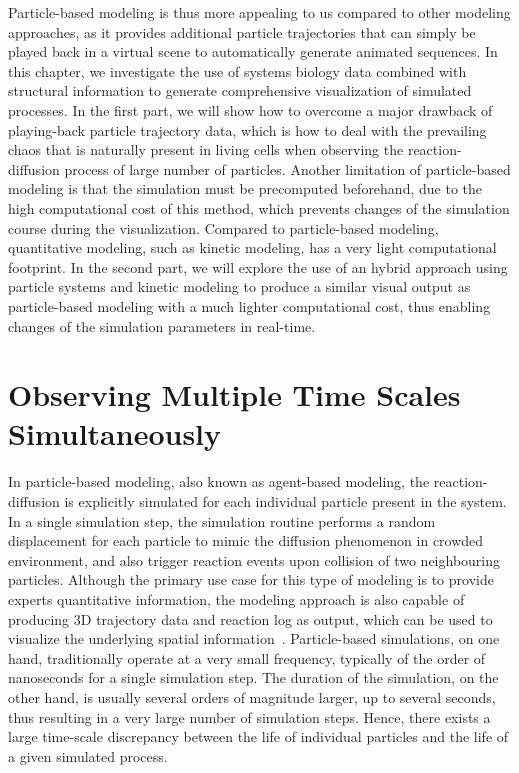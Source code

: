 Particle-based modeling is thus more appealing to us compared to other modeling approaches, as it provides additional particle trajectories that can simply be played back in a virtual scene to automatically generate animated sequences.
In this chapter, we investigate the use of systems biology data combined with structural information to generate comprehensive visualization of simulated processes.
In the first part, we will show how to overcome a major drawback of playing-back particle trajectory data, which is how to deal with the prevailing chaos that is naturally present in living cells when observing the reaction-diffusion process of large number of particles.
Another limitation of particle-based modeling is that the simulation must be precomputed beforehand, due to the high computational cost of this method, which prevents changes of the simulation course during the visualization.
Compared to particle-based modeling, quantitative modeling, such as kinetic modeling, has a very light computational footprint.
In the second part, we will explore the use of an hybrid approach using particle systems and kinetic modeling to produce a similar visual output as particle-based modeling with a much lighter computational cost, thus enabling changes of the simulation parameters in real-time. 

\section{Observing Multiple Time Scales Simultaneously}

In particle-based modeling, also known as agent-based modeling, the reaction-diffusion is explicitly simulated for each individual particle present in the system.
In a single simulation step, the simulation routine performs a random displacement for each particle to mimic the diffusion phenomenon in crowded environment, and also trigger reaction events upon collision of two neighbouring particles.
Although the primary use case for this type of modeling is to provide experts quantitative information, the modeling approach is also capable of producing 3D trajectory data and reaction log as output, which can be used to visualize the underlying spatial information~\cite{falk2009visualization}.
Particle-based simulations, on one hand, traditionally operate at a very small frequency, typically of the order of nanoseconds for a single simulation step.  
The duration of the simulation, on the other hand, is usually several orders of magnitude larger, up to several seconds, thus resulting in a very large number of simulation steps.
Hence, there exists a large time-scale discrepancy between the life of individual particles and the life of a given simulated process.

